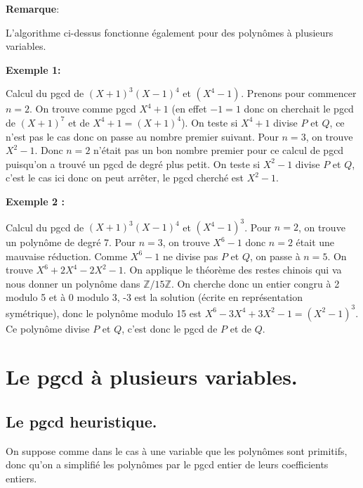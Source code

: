 \documentclass[a4paper,11pt]{book}
\begin{document}
\begin{giacjshere}
{\bf{Remarque}}:

L'algorithme ci-dessus fonctionne également pour des polynômes à plusieurs
variables.

{\bf{Exemple 1:}}

Calcul du pgcd de $( X + 1 )^3 ( X - 1 )^4$ et $( X^4 - 1 )^{}$. Prenons pour
commencer $n = 2$. On trouve comme pgcd $X^4 + 1$ (en effet $- 1 = 1$ donc on
cherchait le pgcd de $( X + 1 )^7$ et de $X^4 + 1 = ( X + 1 )^4$). On teste si
$X^4 + 1$ divise $P$ et $Q$, ce n'est pas le cas donc on passe au nombre
premier suivant. Pour $n = 3$, on trouve $X^2 - 1$. Donc $n = 2$ n'était pas un
bon nombre premier pour ce calcul de pgcd puisqu'on a trouvé un pgcd de degré
plus petit. On teste si $X^2 - 1$ divise $P$ et $Q$, c'est le cas ici donc on
peut arrêter, le pgcd cherché est $X^2-1$.

{\bf{Exemple} 2 :}

Calcul du pgcd de $( X + 1 )^3 ( X - 1 )^4$ et $( X^4 - 1 )^3$. 
Pour $n = 2$, on trouve un polynôme de degré 7.
Pour $n = 3$, on trouve $X^6 - 1$ donc $n = 2$ était une mauvaise réduction.
Comme $X^6 - 1$ ne divise pas $P$ et $Q$, on passe à $n = 5$. On trouve $X^6 +
2 X^4 - 2 X^2 - 1$. On applique le théorème des restes chinois qui va nous
donner un polynôme dans $\mathbb{Z} / 15 \mathbb{Z}$. On cherche donc un
entier congru à 2 modulo 5 et à 0 modulo 3, -3 est la solution (écrite en
représentation symétrique), donc le polynôme modulo 15 est $X^6 - 3 X^4 + 3
X^2 - 1 = ( X^2 - 1 )^3$. Ce polynôme divise $P$ et $Q$, c'est donc le pgcd de
$P$ et de $Q$.

\section{Le pgcd à plusieurs variables.}

\subsection{Le pgcd heuristique.}

On suppose comme dans le cas à une variable que les polynômes sont primitifs,
donc qu'on a simplifié les polynômes par le pgcd entier de leurs coefficients
entiers.


\end{giacjshere}
\end{document}
